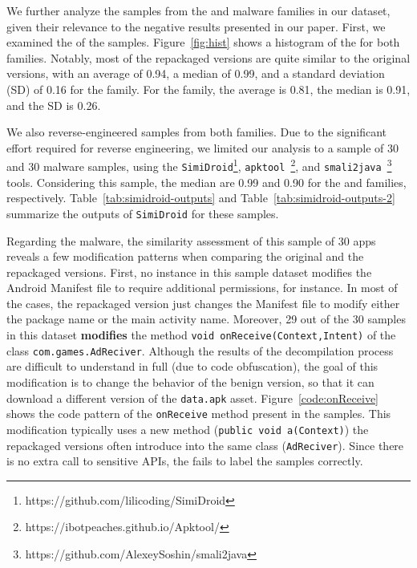We further analyze the samples from the \gps and \rmb malware families in our dataset, given their relevance to the negative results presented in our paper. First, we examined the \sscore of the samples. Figure~\ref{fig:hist} shows a histogram of the \sscore for both families. Notably, most of the repackaged versions are quite similar to the original versions, with an average \sscore of 0.94, a median of 0.99, and a standard deviation (SD) of 0.16 for the \gps family. For the \rmb family, the average \sscore is 0.81, the median is 0.91, and the SD is 0.26.


We also reverse-engineered samples from both families. Due to the significant effort required for reverse engineering, we limited our analysis to a sample of 30 \gps and 30 \rmb malware samples, using the \texttt{SimiDroid}\footnote{https://github.com/lilicoding/SimiDroid},
\texttt{apktool}~\footnote{https://ibotpeaches.github.io/Apktool/},
and \texttt{smali2java}~\footnote{https://github.com/AlexeySoshin/smali2java} tools. Considering this sample, the median \sscore are 0.99 and 0.90 for the \gps and \rmb families, respectively. Table~\ref{tab:simidroid-outputs} and Table~\ref{tab:simidroid-outputs-2} summarize the outputs of \texttt{SimiDroid} for these samples.


Regarding the \gps malware, the similarity assessment of this sample of 30 apps reveals a few modification patterns when comparing the original and the repackaged versions. First, no instance in this \gps sample dataset modifies the Android Manifest file to require additional permissions, for instance. In most of the cases, the repackaged version just changes the Manifest file to modify either the package name or the main activity name. Moreover, 29 out of the 30 samples in this dataset  {\bf modifies} the 
method \texttt{void onReceive(Context,Intent)} of the class \texttt{com.games.AdReciver}. Although the results of the decompilation process are difficult to understand in full (due to code obfuscation), the goal of this modification is to change the behavior of the benign version, so that it can download a different version of the \texttt{data.apk} 
asset. Figure~\ref{code:onReceive} shows the code pattern of the \texttt{onReceive} method present in the samples. This modification typically uses a new method (\texttt{public void a(Context)}) the repackaged versions often introduce into the same class (\texttt{AdReciver}). Since there is no extra call to sensitive APIs, the \mas fails to label the \gps samples correctly. 

